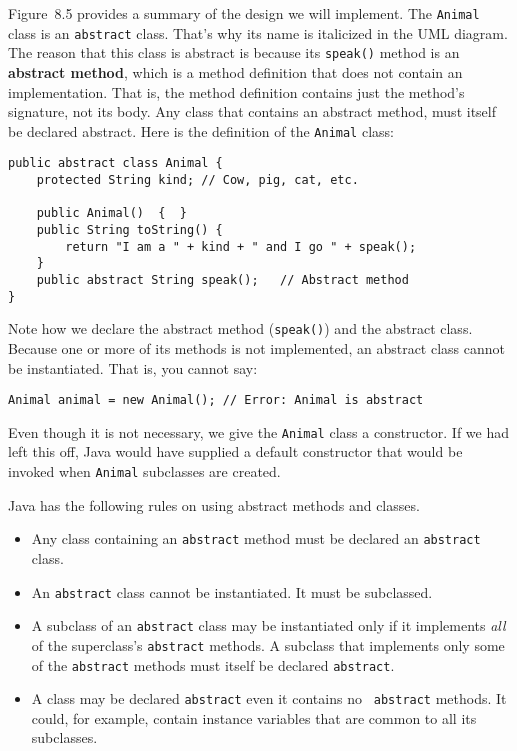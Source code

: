 Figure~8.5 provides a summary of the design we will implement. The
{\tt Animal} class is an {\tt abstract} class. That's why its name is
italicized in the UML diagram. The reason that this class is abstract
is because its {\tt speak()} method is an {\bf abstract method}, which
is a method definition that does not contain an implementation. That
is, the method definition contains just the method's signature, not
its body. Any class that contains an abstract method, must itself be
declared abstract. Here is the definition of the {\tt Animal} class:

\begin{jjjlisting}
\begin{lstlisting}
public abstract class Animal {
    protected String kind; // Cow, pig, cat, etc.
         
    public Animal()  {  }
    public String toString() {
        return "I am a " + kind + " and I go " + speak();
    }
    public abstract String speak();   // Abstract method
}
\end{lstlisting}
\end{jjjlisting}

\noindent Note how we declare the abstract method ({\tt speak()}) and
the abstract class.  Because one or more of its methods is not
implemented, an abstract class cannot be instantiated. That is, you
cannot say:

\begin{jjjlisting}
\begin{lstlisting}
Animal animal = new Animal(); // Error: Animal is abstract
\end{lstlisting}
\end{jjjlisting}

\noindent Even though it is not necessary, we give the {\tt Animal} 
class a constructor.  If we had left this off, Java would have
supplied a default constructor that would be invoked when {\tt Animal}
subclasses are created.

Java has the following rules on using abstract methods and
classes.

\begin{itemize}

\item Any class containing an {\tt abstract} method must be declared
an \mbox{\tt abstract} class.

\item An {\tt abstract} class cannot be instantiated.  It must be
subclassed.

\item A subclass of an {\tt abstract} class may be instantiated only
if it implements {\it all} of the superclass's {\tt abstract} methods.
A subclass that implements only some of the {\tt abstract} methods
must itself be declared {\tt abstract}.

\item A class may be declared {\tt abstract} even it contains no {\tt
abstract} methods.  It could, for example, contain instance variables
that are common to all its subclasses.
\end{itemize}

